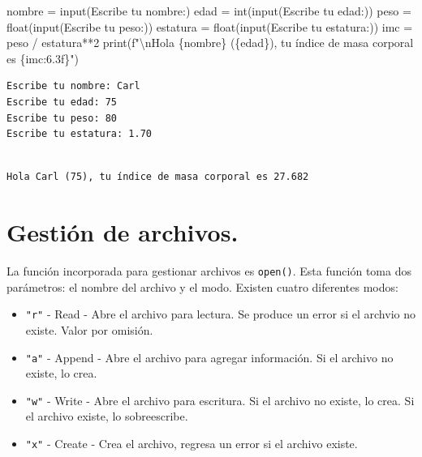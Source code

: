 \documentclass[
  spanish,
  letterpaper,
]{scrbook}
\newenvironment{Shaded}{\begin{snugshade}}{\end{snugshade}}
\newcommand{\BuiltInTok}[1]{\textcolor[rgb]{0.00,0.23,0.31}{#1}}
\newcommand{\CharTok}[1]{\textcolor[rgb]{0.13,0.47,0.30}{#1}}
\newcommand{\DecValTok}[1]{\textcolor[rgb]{0.68,0.00,0.00}{#1}}
\newcommand{\NormalTok}[1]{\textcolor[rgb]{0.00,0.23,0.31}{#1}}
\newcommand{\OperatorTok}[1]{\textcolor[rgb]{0.37,0.37,0.37}{#1}}
\newcommand{\SpecialCharTok}[1]{\textcolor[rgb]{0.37,0.37,0.37}{#1}}
\newcommand{\SpecialStringTok}[1]{\textcolor[rgb]{0.13,0.47,0.30}{#1}}
\newcommand{\StringTok}[1]{\textcolor[rgb]{0.13,0.47,0.30}{#1}}
\providecommand{\tightlist}{%
  \setlength{\itemsep}{0pt}\setlength{\parskip}{0pt}}
\theoremstyle{definition}
\theoremstyle{remark}
\begin{document}
\begin{Shaded}
\begin{Highlighting}[]
\NormalTok{nombre }\OperatorTok{=} \BuiltInTok{input}\NormalTok{(}\StringTok{\textquotesingle{}Escribe tu nombre:\textquotesingle{}}\NormalTok{)}
\NormalTok{edad }\OperatorTok{=} \BuiltInTok{int}\NormalTok{(}\BuiltInTok{input}\NormalTok{(}\StringTok{\textquotesingle{}Escribe tu edad:\textquotesingle{}}\NormalTok{))}
\NormalTok{peso }\OperatorTok{=} \BuiltInTok{float}\NormalTok{(}\BuiltInTok{input}\NormalTok{(}\StringTok{\textquotesingle{}Escribe tu peso:\textquotesingle{}}\NormalTok{))}
\NormalTok{estatura }\OperatorTok{=} \BuiltInTok{float}\NormalTok{(}\BuiltInTok{input}\NormalTok{(}\StringTok{\textquotesingle{}Escribe tu estatura:\textquotesingle{}}\NormalTok{))}
\NormalTok{imc }\OperatorTok{=}\NormalTok{ peso }\OperatorTok{/}\NormalTok{ estatura}\OperatorTok{**}\DecValTok{2}
\BuiltInTok{print}\NormalTok{(}\SpecialStringTok{f"}\CharTok{\textbackslash{}n}\SpecialStringTok{Hola }\SpecialCharTok{\{}\NormalTok{nombre}\SpecialCharTok{\}}\SpecialStringTok{ (}\SpecialCharTok{\{}\NormalTok{edad}\SpecialCharTok{\}}\SpecialStringTok{), tu índice de masa corporal es }\SpecialCharTok{\{}\NormalTok{imc}\SpecialCharTok{:6.3f\}}\SpecialStringTok{"}\NormalTok{)}
\end{Highlighting}
\end{Shaded}

\begin{verbatim}
Escribe tu nombre: Carl
Escribe tu edad: 75
Escribe tu peso: 80
Escribe tu estatura: 1.70
\end{verbatim}

\begin{verbatim}

Hola Carl (75), tu índice de masa corporal es 27.682
\end{verbatim}

\section{Gestión de archivos.}\label{gestiuxf3n-de-archivos.}

La función incorporada para gestionar archivos es \texttt{open()}. Esta
función toma dos parámetros: el nombre del archivo y el modo. Existen
cuatro diferentes modos:

\begin{itemize}
\tightlist
\item
  \texttt{"r"} - Read - Abre el archivo para lectura. Se produce un
  error si el archvio no existe. Valor por omisión.
\item
  \texttt{"a"} - Append - Abre el archivo para agregar información. Si
  el archivo no existe, lo crea.
\item
  \texttt{"w"} - Write - Abre el archivo para escritura. Si el archivo
  no existe, lo crea. Si el archivo existe, lo sobreescribe.
\item
  \texttt{"x"} - Create - Crea el archivo, regresa un error si el
  archivo existe.
\end{itemize}
\end{document}
